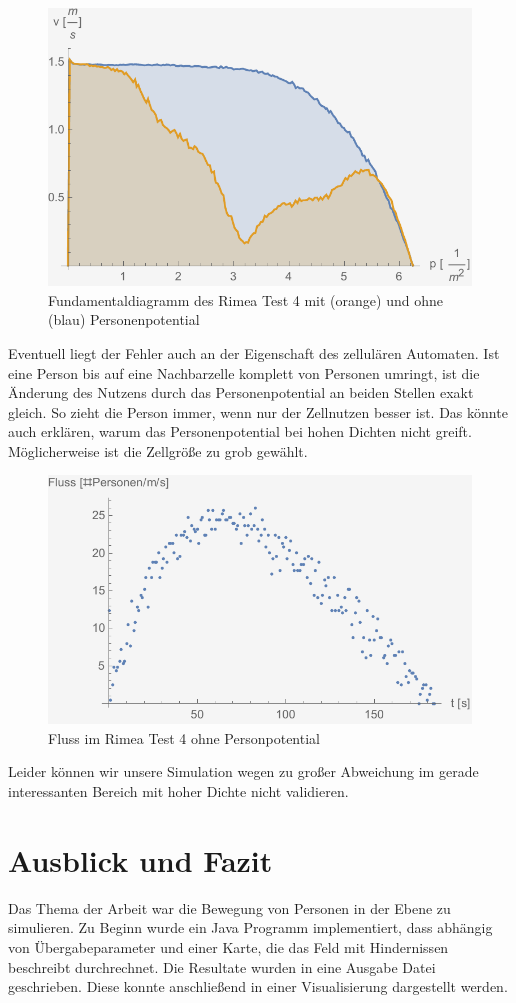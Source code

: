 \begin{figure}
	\centering
	\includegraphics[width=0.7\linewidth]{abbildungen/fundamentaldiagramm/vergleich-ohnep}
	\caption{Fundamentaldiagramm des Rimea Test 4 mit (orange) und ohne (blau) Personenpotential}
	\label{fig:rimea4:vergleich-ohnep}
\end{figure}



Eventuell liegt der Fehler auch an der Eigenschaft des zellulären Automaten. 
Ist eine Person bis auf eine Nachbarzelle komplett von Personen umringt, ist die Änderung des Nutzens durch das Personenpotential an beiden Stellen exakt gleich. So zieht die Person immer, wenn nur der Zellnutzen besser ist. Das könnte auch erklären, warum das Personenpotential bei hohen Dichten nicht greift. Möglicherweise ist die Zellgröße zu grob gewählt.

\begin{figure}
	\centering
	\includegraphics[width=0.7\linewidth]{abbildungen/fundamentaldiagramm/fluss-ohnep}
	\caption{Fluss im Rimea Test 4 ohne Personpotential}
	\label{fig:rimea4:fluss-ohnep}
\end{figure}

Leider können wir unsere Simulation wegen zu großer Abweichung im gerade interessanten Bereich mit hoher Dichte nicht validieren.
 
\section{Ausblick und Fazit}
Das Thema der Arbeit war die Bewegung von Personen in der Ebene zu simulieren. Zu Beginn wurde ein Java Programm implementiert, dass abhängig von Übergabeparameter und einer Karte, die das Feld mit Hindernissen beschreibt durchrechnet. Die Resultate wurden in eine Ausgabe Datei geschrieben. Diese konnte anschließend in einer Visualisierung dargestellt werden.

